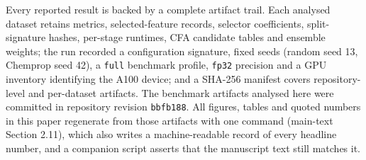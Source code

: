 \documentclass[11pt,a4paper]{article}
\begin{document}
Every reported result is backed by a complete artifact trail. Each analysed dataset retains metrics, selected-feature records, selector coefficients, split-signature hashes, per-stage runtimes, CFA candidate tables and ensemble weights; the run recorded a configuration signature, fixed seeds (random seed 13, Chemprop seed 42), a \texttt{full} benchmark profile, \texttt{fp32} precision and a GPU inventory identifying the A100 device; and a SHA-256 manifest covers repository-level and per-dataset artifacts. The benchmark artifacts analysed here were committed in repository revision \texttt{bbfb188}. All figures, tables and quoted numbers in this paper regenerate from those artifacts with one command (main-text Section 2.11), which also writes a machine-readable record of every headline number, and a companion script asserts that the manuscript text still matches it.
\end{document}

